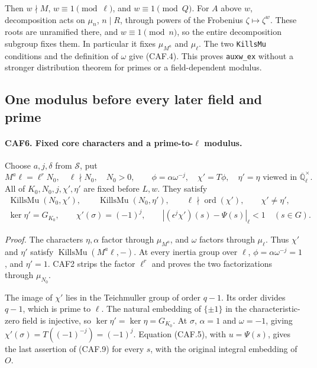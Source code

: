 Then \(w\nmid M\), \(w\equiv1\pmod\ell\), and
\(w\equiv1\pmod Q\).  For \(A\) above \(w\), decomposition
acts on \(\mu_n\), \(n\mid R\), through powers of the Frobenius
\(\zeta\mapsto\zeta^w\).  These roots are unramified there, and
\(w\equiv1\pmod n\), so the entire decomposition subgroup fixes
them.  In particular it fixes \(\mu_{M^a}\) and \(\mu_\ell\).
The two \texttt{KillsMu} conditions and the definition of \(\omega\)
give (CAF.4).  This proves \texttt{auxw\_ex} without a stronger
distribution theorem for primes or a field-dependent modulus.

\subsection{One modulus before every later field and prime}

\paragraph{CAF6. Fixed core characters and a prime-to-\(\ell\) modulus.}
\label{claim:CAF6}
Choose \(a,j,\delta\) from \(\mathcal S\), put
\[
 M^a\ell=\ell^rN_0,\quad \ell\nmid N_0,\quad N_0>0,
 \qquad \phi=\alpha\omega^{-j},\quad
 \chi'=T\phi,\quad \eta'=\eta\text{ viewed in }
                  \overline{\mathbb Q}_\ell^\times.
 \tag{CAF.8}
\]
All of \(K_0,N_0,j,\chi',\eta'\) are fixed before \(L,w\).
They satisfy
\[
 \begin{gathered}
 \operatorname{KillsMu}(N_0,\chi'),\qquad
 \operatorname{KillsMu}(N_0,\eta'),\qquad
 \ell\nmid\operatorname{ord}(\chi'),\qquad \chi'\ne\eta',\\
 \ker\eta'=G_{K_0},\qquad \chi'(\sigma)=(-1)^j,\qquad
 |(\epsilon^j\chi')(s)-\Psi(s)|_\ell<1\quad(s\in G).
 \end{gathered}
 \tag{CAF.9}
\]

\emph{Proof.}
The characters \(\eta,\alpha\) factor through \(\mu_{M^a}\),
and \(\omega\) factors through \(\mu_\ell\).  Thus \(\chi'\)
and \(\eta'\) satisfy \(\operatorname{KillsMu}(M^a\ell,-)\).
At every inertia group over \(\ell\),
\(\phi=\alpha\omega^{-j}=1\), and \(\eta'=1\).
CAF2 strips the factor \(\ell^r\) and proves the two factorizations
through \(\mu_{N_0}\).

The image of \(\chi'\) lies in the Teichmuller group of order
\(q-1\).  Its order divides \(q-1\), which is prime to \(\ell\).
The natural embedding of \(\{\pm1\}\) in the characteristic-zero
field is injective, so \(\ker\eta'=\ker\eta=G_{K_0}\).
At \(\sigma\), \(\alpha=1\) and \(\omega=-1\), giving
\(\chi'(\sigma)=T((-1)^{-j})=(-1)^j\).  Equation (CAF.5), with
\(u=\Psi(s)\), gives the last assertion of (CAF.9) for every
\(s\), with the original integral embedding of \(O\).

